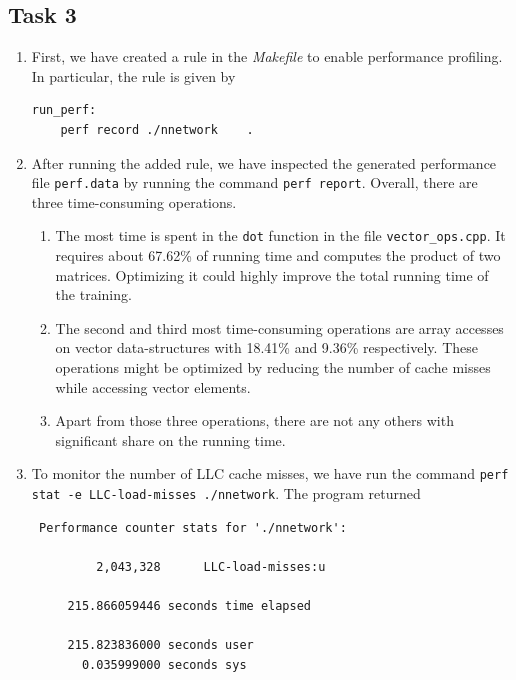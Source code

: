 \documentclass[a4paper, DIV12, headsepline]{scrartcl}
\begin{document}
\subsection*{Task 3}
\begin{enumerate}[label=(\alph*)]
\item First, we have created a rule in the \textit{Makefile} to enable performance profiling. In particular, the rule is given by
\begin{verbatim}
run_perf:
    perf record ./nnetwork    .
\end{verbatim}

\item After running the added rule, we have inspected the generated performance file \texttt{perf.data} by running the command \texttt{perf report}. Overall, there are three time-consuming operations.
\begin{enumerate}[label=(\arabic*)]
\item The most time is spent in the \texttt{dot} function in the file \texttt{vector\_ops.cpp}. It requires about 67.62\% of running time and computes the product of two matrices. Optimizing it could highly improve the total running time of the training.
\item The second and third most time-consuming operations are array accesses on vector data-structures with 18.41\% and 9.36\% respectively. These operations might be optimized by reducing the number of cache misses while accessing vector elements.
\item Apart from those three operations, there are not any others with significant share on the running time. 
\end{enumerate}

\item To monitor the number of LLC cache misses, we have run the command \texttt{perf stat -e LLC-load-misses ./nnetwork}. The program returned
\begin{verbatim}
 Performance counter stats for './nnetwork':

         2,043,328      LLC-load-misses:u

     215.866059446 seconds time elapsed

     215.823836000 seconds user
       0.035999000 seconds sys

\end{verbatim}

\end{enumerate}
\end{document}

